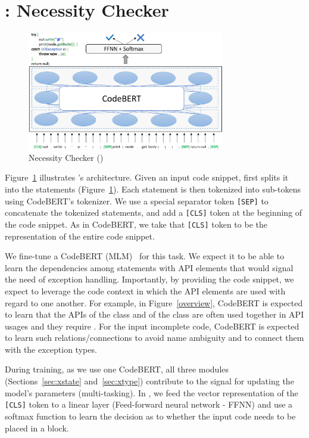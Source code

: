 \section{{\xblock}:  Necessity Checker}
\label{xblock:sec}

\begin{figure}[t]
 	\centering
 	\includegraphics[width=3.4in]{xblock-6.png} %
        \vspace{-20pt}
 	\caption{ Necessity Checker ({\xblock})}
 	\label{fig:xblock}	
\end{figure}

Figure~\ref{fig:xblock} illustrates {\xblock}'s architecture.  Given
an input code snippet, {\xblock} first splits it into the statements
(Figure~\ref{fig:xblock}). Each statement is then tokenized into
sub-tokens using CodeBERT's tokenizer. We use a special separator
token \texttt{[SEP]} to concatenate the tokenized statements, and add
a \texttt{[CLS]} token at the beginning of the code snippet. As in
CodeBERT, we take that \texttt{[CLS]} token to be the representation
of the entire code snippet.

We fine-tune a CodeBERT (MLM)~\cite{codebertMLM} for this task.
We expect it to be able to learn the dependencies among statements
with API elements that would signal the need of exception
handling. Importantly, by providing the code snippet, we expect to
leverage the code context in which the API elements are used with
regard to one another. For example, in Figure~\ref{overview}, CodeBERT
is expected to learn that the APIs  of the
class  and  of the class
 are often used together in API usages and they
require . For the input incomplete code,
CodeBERT is expected to learn such relations/connections to avoid name
ambiguity and to connect them with the exception types.

During training, as we use one CodeBERT, all three modules
(Sections~\ref{sec:xstate} and~\ref{sec:xtype}) contribute to the
signal for updating the model's parameters (multi-tasking). In
{\xblock}, we feed the vector representation of the \texttt{[CLS]}
token to a linear layer (Feed-forward neural network - FFNN) and use a
softmax function to learn the decision as to whether the input code
needs to be placed in a  block.

